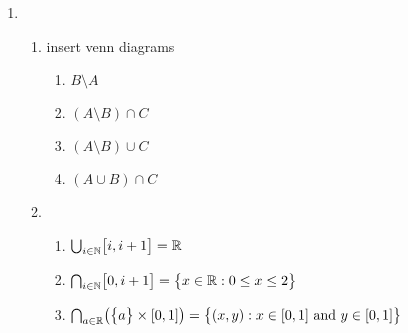 \begin{enumerate}
      \item
            \begin{enumerate}[label=(\alph*), itemsep=16pt]
                  \item insert venn diagrams
                        \begin{enumerate}[label=(\roman*), itemsep=10pt]
                              \item $B \setminus A$
                              \item $(A \setminus B) \cap C$
                              \item $(A \setminus B) \cup C$
                              \item $(A \cup B) \cap C$
                        \end{enumerate}

                  \item
                        \begin{enumerate}[label=(\roman*), itemsep=10pt]
                              \item $\bigcup_{i \in \operatorname{\mathbb{N}}} \bigl[i,i+1\bigr] = \operatorname{\mathbb{R}}$
                              \item $\bigcap_{i \in \operatorname{\mathbb{N}}} \bigl[0,i+1\bigr] = \bigl\{ { x \in \operatorname{\mathbb{R}} : 0 \le x \le 2 } \bigr\}$
                              \item $\bigcap_{a \in \operatorname{\mathbb{R}}} \bigl(\bigl\{ {a} \bigr\} \times [0, 1]\bigr) = \bigl\{ { (x,y) : x \in [0,1] \text{ and } y \in [0,1] } \bigr\}$
                        \end{enumerate}
            \end{enumerate}
\end{enumerate}


